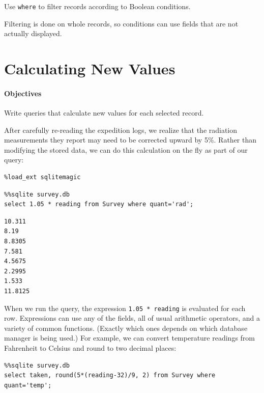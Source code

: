 \documentclass{book}
\begin{document}
\begin{swcitemize}
\item
  Use \texttt{where} to filter records according to Boolean conditions.
\item
  Filtering is done on whole records, so conditions can use fields that
  are not actually displayed.
\end{swcitemize}

\section{Calculating New Values}

\mbox{}\paragraph{Objectives}

\begin{swcitemize}
\item
  Write queries that calculate new values for each selected record.
\end{swcitemize}

After carefully re-reading the expedition logs, we realize that the
radiation measurements they report may need to be corrected upward by
5\%. Rather than modifying the stored data, we can do this calculation
on the fly as part of our query:

\begin{verbatim}
%load_ext sqlitemagic
\end{verbatim}

\begin{verbatim}
%%sqlite survey.db
select 1.05 * reading from Survey where quant='rad';
\end{verbatim}

\begin{verbatim}
10.311
8.19
8.8305
7.581
4.5675
2.2995
1.533
11.8125
\end{verbatim}

When we run the query, the expression \texttt{1.05 * reading} is
evaluated for each row. Expressions can use any of the fields, all of
usual arithmetic operators, and a variety of common functions. (Exactly
which ones depends on which database manager is being used.) For
example, we can convert temperature readings from Fahrenheit to Celsius
and round to two decimal places:

\begin{verbatim}
%%sqlite survey.db
select taken, round(5*(reading-32)/9, 2) from Survey where quant='temp';
\end{verbatim}
\end{document}
